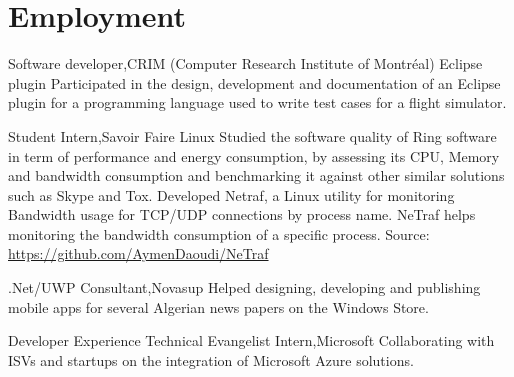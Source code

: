 \section{Employment}
  \resumeSubHeadingListStart
    \resumeSubheading
    {Software developer,}{CRIM (Computer Research Institute of Montréal)}{}
    {}
      \resumeItemListStart
      \renewcommand{\labelitemii}{\raisebox{.25cm}{$\bullet$}}
        \resumeItem
         {Eclipse plugin}
         {Participated in the design, development and documentation of an Eclipse plugin for a programming language 
          used to write test cases for a flight simulator.}
      \resumeItemListEnd

    \resumeSubheading
    {Student Intern,}{Savoir Faire Linux}{}{}
      \resumeItemListStart
        \renewcommand{\labelitemii}{\raisebox{.45cm}{$\bullet$}}
          {Studied the software quality of Ring software in term of performance and energy consumption, by assessing 
          its CPU, Memory and bandwidth consumption and benchmarking it against other similar solutions such as Skype and Tox.}
          \renewcommand{\labelitemii}{\raisebox{.5cm}{$\bullet$}}
          {Developed Netraf, a Linux utility for monitoring Bandwidth usage for TCP/UDP connections by process name.
          NeTraf helps monitoring the bandwidth consumption of a specific process. Source: \url{https://github.com/AymenDaoudi/NeTraf}}
      \resumeItemListEnd 

    \resumeSubheading
    {.Net/UWP Consultant,}{Novasup}{}{}
      \resumeItemListStart
      \renewcommand{\labelitemii}{\raisebox{.2cm}{$\bullet$}}
          {Helped designing, developing and publishing mobile apps for several Algerian news papers on the Windows Store.}
      \resumeItemListEnd 
    
    \resumeSubheading
    {Developer Experience Technical Evangelist Intern,}{Microsoft}{}{}
      \resumeItemListStart
      \renewcommand{\labelitemii}{\raisebox{.19cm}{$\bullet$}}
          {Collaborating with ISVs and startups on the integration of Microsoft Azure solutions.}
      \resumeItemListEnd

